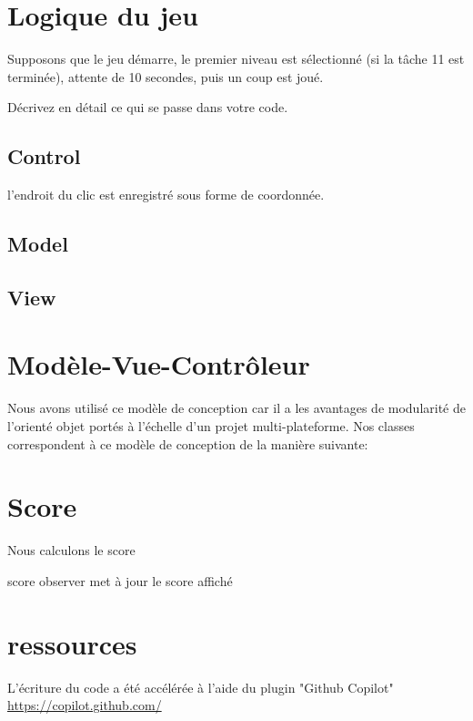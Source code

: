 \documentclass{article}
\begin{document}
    \section{Logique du jeu}
    Supposons que le jeu démarre,
    le premier niveau est sélectionné (si la
    tâche 11 est terminée),
    attente de 10 secondes,
    puis un coup est joué.

    Décrivez en détail ce qui
    se passe dans votre code.


    \subsection{Control}
    l'endroit du clic est enregistré sous forme de coordonnée.
    \subsection{Model}
    \subsection{View}

    \section{Modèle-Vue-Contrôleur}
    Nous avons utilisé ce modèle de conception car il a les avantages de modularité de l'orienté objet portés à l'échelle d'un projet multi-plateforme. Nos classes correspondent à ce modèle de conception de la manière suivante:


    \section{Score}
    Nous calculons le score

    score observer met à jour le score affiché

    \section{ressources}




    L'écriture du code a été accélérée à l'aide du plugin "Github Copilot"
    \href{https://copilot.github.com/}{https://copilot.github.com/}
\end{document}
